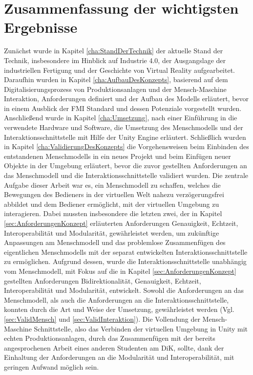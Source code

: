 \section{Zusammenfassung der wichtigsten Ergebnisse}\label{sec:ZusammenfassungErgebnisse}
Zunächst wurde in Kapitel \ref{cha:StandDerTechnik} der aktuelle Stand der Technik, insbesondere im Hinblick auf Industrie 4.0, der Ausgangslage der industriellen Fertigung und der Geschichte von Virtual Reality aufgearbeitet.
Daraufhin wurden in Kapitel \ref{cha:AufbauDesKonzepts}, basierend auf dem Digitalisierungsprozess von Produktionsanlagen und der Mensch-Maschine Interaktion, Anforderungen definiert und der Aufbau des Modells erläutert, bevor in einem Ausblick der FMI Standard und dessen Potenziale vorgestellt wurden.
Anschließend wurde in Kapitel \ref{cha:Umsetzung}, nach einer Einführung in die verwendete Hardware und Software, die Umsetzung des Menschmodells und der Interaktionsschnittstelle mit Hilfe der Unity Engine erläutert. 
Schließlich wurden in Kapitel \ref{cha:ValidierungDesKonzepts} die Vorgehensweisen beim Einbinden des entstandenen Menschmodells in ein neues Projekt und beim Einfügen neuer Objekte in der Umgebung erläutert, bevor die zuvor gestellten Anforderungen an das Menschmodell und die Interaktionsschnittstelle validiert wurden.
\newline\newline
Die zentrale Aufgabe dieser Arbeit war es, ein Menschmodell zu schaffen, welches die Bewegungen des Bedieners in der virtuellen Welt nahezu verzögerungsfrei abbildet und dem Bediener ermöglicht, mit der virtuellen Umgebung zu interagieren. Dabei mussten insbesondere die letzten zwei, der in Kapitel \ref{sec:AnforderungenKonzept} erläuterten Anforderungen Genauigkeit, Echtzeit, Interoperabilität und Modularität, gewährleistet werden, um zukünftige Anpassungen am Menschmodell und das problemlose Zusammenfügen des eigentlichen Menschmodells mit der separat entwickelten Interaktionsschnittstelle zu ermöglichen.
Aufgrund dessen, wurde die Interaktionsschnittstelle unabhängig vom Menschmodell, mit Fokus auf die in Kapitel \ref{sec:AnforderungenKonzept} gestellten Anforderungen Bidirektionalität, Genauigkeit, Echtzeit, Interoperabilität und Modularität, entwickelt. Sowohl die Anforderungen an das Menschmodell, als auch die Anforderungen an die Interaktionsschnittstelle, konnten durch die Art und Weise der Umsetzung, gewährleistet werden (Vgl. \ref{sec:ValidMensch} und \ref{sec:ValidInteraktion}).
Die Vollendung der Mensch-Maschine Schnittstelle, also das Verbinden der virtuellen Umgebung in Unity mit echten Produktionsanlagen, durch das Zusammenfügen mit der bereits angesprochenen Arbeit eines anderen Studenten am DiK, sollte, dank der Einhaltung der Anforderungen an die Modularität und Interoperabilität, mit geringen Aufwand möglich sein.

